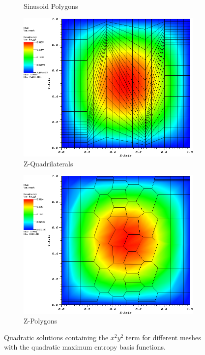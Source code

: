 \begin{figure}
{\begin{subfigure}[b]{0.460\textwidth}
		\caption{Sinusoid Polygons}
	\end{subfigure}
}
\vspace{3mm}
{
	\begin{subfigure}[b]{0.465\textwidth}
		\centering
		\label{subfig::x2y2_z_quad_me_k2_lin_sol}
		\includegraphics[width=\textwidth]{figures/sec_BF/x2y2Sol_ZQuad_ME2.png}
		\caption{Z-Quadrilaterals}
	\end{subfigure}
	\hfill
	\begin{subfigure}[b]{0.465\textwidth}
		\centering
		\label{subfig::x2y2_z_poly_me_k2_lin_sol}
		\includegraphics[width=\textwidth]{figures/sec_BF/x2y2Sol_ZPoly_ME2.png}
		\caption{Z-Polygons}
	\end{subfigure}
}
\caption{Quadratic solutions containing the $x^2y^2$ term for different meshes with the quadratic maximum entropy basis functions.}
\label{fig::BF_Results_x2y2_sol_ME2}
\end{figure}

